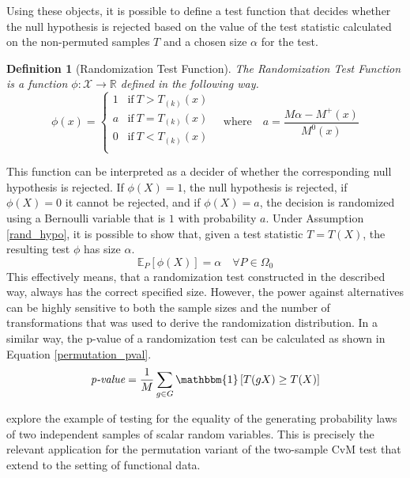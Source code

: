 \documentclass[12pt, a4paper]{article}
\theoremstyle{MAstyle} \newtheorem{assumption}{Assumption}[section]
\theoremstyle{MAstyle} \newtheorem{definition}{Definition}[section]
\theoremstyle{MAstyle} \newtheorem{theorem}{Theorem}[section]
\begin{document}
			Using these objects, it is possible to define a test function that decides whether the null hypothesis is rejected based on the value of the test statistic calculated on the non-permuted samples $T$ and a chosen size $\alpha$ for the test.
			\begin{definition}[Randomization Test Function]\label{RandTestFunc}
				The Randomization Test Function is a function $\phi: \mathcal{X} \rightarrow \mathbb{R}$ defined in the following way.
					\begin{equation*}
						\phi(x) = \begin{cases}
							1 &\text{if} \ T > T_{(k)}(x) \\
							a &\text{if} \ T = T_{(k)}(x) \\
							0 &\text{if} \ T < T_{(k)}(x) \\
						\end{cases} \quad \text{where} \quad
						a = \frac{M\alpha - M^{+}(x)}{M^{0}(x)}
					\end{equation*}
				
			\end{definition}
			This function can be interpreted as a decider of whether the corresponding null hypothesis is rejected. If $\phi(X) = 1$, the null hypothesis is rejected, if $\phi(X) = 0$ it cannot be rejected, and if $\phi(X) = a$, the decision is randomized using a Bernoulli variable that is $1$ with probability $a$. 
			Under Assumption \ref{rand_hypo}, it is possible to show that, given a test statistic $T = T(X)$, the resulting test $\phi$ has size $\alpha$.
			\begin{equation}
				\mathbb{E}_{P}\left[\phi(X)\right] = \alpha \quad \forall P \in \Omega_0
			\end{equation}
			This effectively means, that a randomization test constructed in the described way, always has the correct specified size. However, the power against alternatives can be highly sensitive to both the sample sizes and the number of transformations that was used to derive the randomization distribution.	
			In a similar way, the p-value of a randomization test can be calculated as shown in Equation \ref{permutation_pval}.
			\begin{equation}\label{permutation_pval}
				\textit{p-value} = \frac{1}{M} \sum_{g \in G} \mathbbm{1}\left[T(gX) \geq T(X)\right]
			\end{equation}
					
			\cite{lehmann_testing_2005} explore the example of testing for the equality of the generating probability laws of two independent samples of scalar random variables. This is precisely the relevant application for the permutation variant of the two-sample CvM test that \cite{bugni_permutation_2021} extend to the setting of functional data. \\
			
\end{document}
